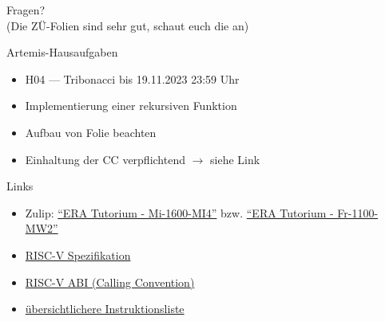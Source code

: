 \documentclass[
  german,            %
  aspectratio=169,    %
]{tumbeamer}
\begin{document}
\begin{frame}[c]{}{}
  \begin{center}
    \LARGE Fragen?\\
    \Large (Die ZÜ-Folien sind sehr gut, schaut euch die an)
  \end{center}
\end{frame}

\begin{frame}[c]{Artemis-Hausaufgaben}{}
  \begin{itemize}
    \item H04 --- Tribonacci bis 19.11.2023 23:59 Uhr
    \item Implementierung einer rekursiven Funktion
    \item Aufbau von Folie beachten
    \item Einhaltung der CC verpflichtend $\rightarrow$ siehe Link
  \end{itemize}
\end{frame}

\begin{frame}[fragile, c]{Links}{}
  \begin{itemize}
    \item Zulip: \href{https://zulip.in.tum.de/#narrow/stream/1917-ERA-Tutorium---Mi-1600-MI4}{\enquote{ERA Tutorium - Mi-1600-MI4}}
    bzw. \href{https://zulip.in.tum.de/#narrow/stream/1940-ERA-Tutorium---Fr-1100-MW2}{\enquote{ERA Tutorium - Fr-1100-MW2}}
    \item \href{https://riscv.org/wp-content/uploads/2017/05/riscv-spec-v2.2.pdf}{RISC-V Spezifikation}
    \item \href{https://www.moodle.tum.de/mod/url/view.php?id=2810277}{RISC-V ABI (Calling Convention)}
    \item \href{https://msyksphinz-self.github.io/riscv-isadoc/html/rvi.html}{übersichtlichere Instruktionsliste}
  \end{itemize}
\end{frame}

\maketitle
\end{document}
